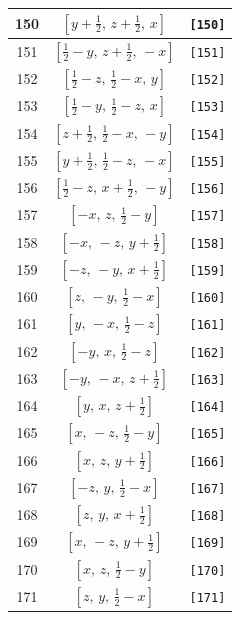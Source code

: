 \documentclass[fleqn,8pt]{jsarticle}
\begin{document}
\begin{longtable}{ccc}
150 & $\left[ y + \frac{1}{2},\, z + \frac{1}{2},\, x \right]$ & {\tt [150]} \\ \hline
151 & $\left[ \frac{1}{2} - y,\, z + \frac{1}{2},\, - x \right]$ & {\tt [151]} \\ \hline
152 & $\left[ \frac{1}{2} - z,\, \frac{1}{2} - x,\, y \right]$ & {\tt [152]} \\ \hline
153 & $\left[ \frac{1}{2} - y,\, \frac{1}{2} - z,\, x \right]$ & {\tt [153]} \\ \hline
154 & $\left[ z + \frac{1}{2},\, \frac{1}{2} - x,\, - y \right]$ & {\tt [154]} \\ \hline
155 & $\left[ y + \frac{1}{2},\, \frac{1}{2} - z,\, - x \right]$ & {\tt [155]} \\ \hline
156 & $\left[ \frac{1}{2} - z,\, x + \frac{1}{2},\, - y \right]$ & {\tt [156]} \\ \hline
157 & $\left[ - x,\, z,\, \frac{1}{2} - y \right]$ & {\tt [157]} \\ \hline
158 & $\left[ - x,\, - z,\, y + \frac{1}{2} \right]$ & {\tt [158]} \\ \hline
159 & $\left[ - z,\, - y,\, x + \frac{1}{2} \right]$ & {\tt [159]} \\ \hline
160 & $\left[ z,\, - y,\, \frac{1}{2} - x \right]$ & {\tt [160]} \\ \hline
161 & $\left[ y,\, - x,\, \frac{1}{2} - z \right]$ & {\tt [161]} \\ \hline
162 & $\left[ - y,\, x,\, \frac{1}{2} - z \right]$ & {\tt [162]} \\ \hline
163 & $\left[ - y,\, - x,\, z + \frac{1}{2} \right]$ & {\tt [163]} \\ \hline
164 & $\left[ y,\, x,\, z + \frac{1}{2} \right]$ & {\tt [164]} \\ \hline
165 & $\left[ x,\, - z,\, \frac{1}{2} - y \right]$ & {\tt [165]} \\ \hline
166 & $\left[ x,\, z,\, y + \frac{1}{2} \right]$ & {\tt [166]} \\ \hline
167 & $\left[ - z,\, y,\, \frac{1}{2} - x \right]$ & {\tt [167]} \\ \hline
168 & $\left[ z,\, y,\, x + \frac{1}{2} \right]$ & {\tt [168]} \\ \hline
169 & $\left[ x,\, - z,\, y + \frac{1}{2} \right]$ & {\tt [169]} \\ \hline
170 & $\left[ x,\, z,\, \frac{1}{2} - y \right]$ & {\tt [170]} \\ \hline
171 & $\left[ z,\, y,\, \frac{1}{2} - x \right]$ & {\tt [171]} \\ \hline

\end{longtable}
\end{document}
